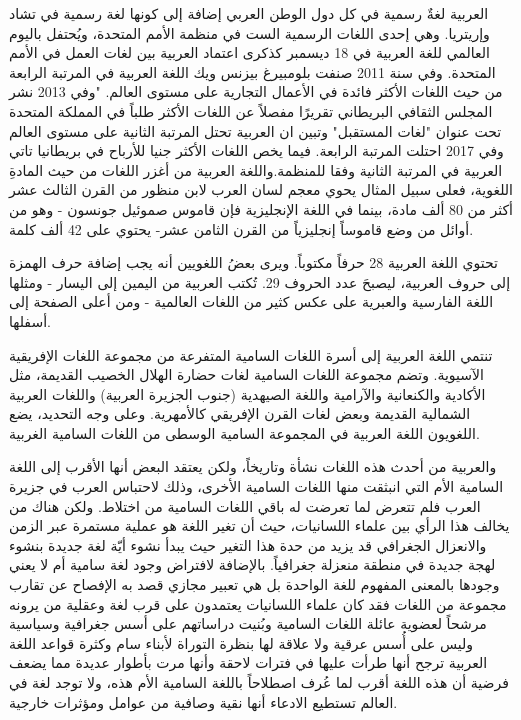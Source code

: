 \documentclass[12pt]{article}
\begin{document}
العربية لغةٌ رسمية في كل دول الوطن العربي إضافة إلى كونها لغة رسمية في تشاد وإريتريا. وهي إحدى اللغات الرسمية الست في منظمة الأمم المتحدة، ويُحتفل باليوم العالمي للغة العربية في 18 ديسمبر كذكرى اعتماد العربية بين لغات العمل في الأمم المتحدة. وفي سنة 2011 صنفت بلومبيرغ بيزنس ويك اللغة العربية في المرتبة الرابعة من حيث اللغات الأكثر فائدة في الأعمال التجارية على مستوى العالم. "وفي 2013 نشر المجلس الثقافي البريطاني تقريرًا مفصلاً عن اللغات الأكثر طلباً في المملكة المتحدة تحت عنوان "لغات المستقبل" وتبين ان العربية تحتل المرتبة الثانية على مستوى العالم وفي 2017 احتلت المرتبة الرابعة. فيما يخص اللغات الأكثر جنيا للأرباح في بريطانيا تاتي العربية في المرتبة الثانية وفقا للمنظمة.واللغة العربية من أغزر اللغات من حيث المادةِ اللغوية، فعلى سبيل المثال يحوي معجم لسان العرب لابن منظور من القرن الثالث عشر أكثر من 80 ألف مادة، بينما في اللغة الإنجليزية فإن قاموس صموئيل جونسون - وهو من أوائل من وضع قاموساً إنجليزياً من القرن الثامن عشر- يحتوي على 42 ألف كلمة.

تحتوي اللغة العربية 28 حرفاً مكتوباً. ويرى بعضُ اللغويين أنه يجب إضافة حرف الهمزة إلى حروف العربية، ليصبحَ عدد الحروف 29. تُكتب العربية من اليمين إلى اليسار - ومثلها اللغة الفارسية والعبرية على عكس كثير من اللغات العالمية - ومن أعلى الصفحة إلى أسفلها.

تنتمي اللغة العربية إلى أسرة اللغات السامية المتفرعة من مجموعة اللغات الإفريقية الآسيوية. وتضم مجموعة اللغات السامية لغات حضارة الهلال الخصيب القديمة، مثل الأكادية والكنعانية والآرامية واللغة الصيهدية (جنوب الجزيرة العربية) واللغات العربية الشمالية القديمة وبعض لغات القرن الإفريقي كالأمهرية. وعلى وجه التحديد، يضع اللغويون اللغة العربية في المجموعة السامية الوسطى من اللغات السامية الغربية.

والعربية من أحدث هذه اللغات نشأة وتاريخاً، ولكن يعتقد البعض أنها الأقرب إلى اللغة السامية الأم التي انبثقت منها اللغات السامية الأخرى، وذلك لاحتباس العرب في جزيرة العرب فلم تتعرض لما تعرضت له باقي اللغات السامية من اختلاط.
ولكن هناك من يخالف هذا الرأي بين علماء اللسانيات، حيث أن تغير اللغة هو عملية مستمرة عبر الزمن والانعزال الجغرافي قد يزيد من حدة هذا التغير حيث يبدأ نشوء أيّة لغة جديدة بنشوء لهجة جديدة في منطقة منعزلة جغرافياً. بالإضافة لافتراض وجود لغة سامية أم لا يعني وجودها بالمعنى المفهوم للغة الواحدة بل هي تعبير مجازي قصد به الإفصاح عن تقارب مجموعة من اللغات فقد كان علماء اللسانيات يعتمدون على قرب لغة وعقلية من يرونه مرشحاً لعضوية عائلة اللغات السامية وبُنيت دراساتهم على أسس جغرافية وسياسية وليس على أُسس عرقية ولا علاقة لها بنظرة التوراة لأبناء سام وكثرة قواعد اللغة العربية ترجح أنها طرأت عليها في فترات لاحقة وأنها مرت بأطوار عديدة مما يضعف فرضية أن هذه اللغة أقرب لما عُرف اصطلاحاً باللغة السامية الأم هذه، ولا توجد لغة في العالم تستطيع الادعاء أنها نقية وصافية من عوامل ومؤثرات خارجية.
\end{document}
